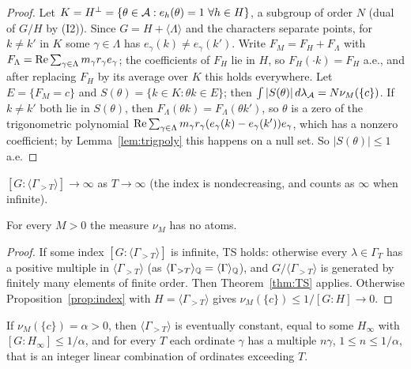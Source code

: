 \begin{proof}
Let $K=H^\perp=\{\theta\in\mathcal A:e_h(\theta)=1\ \forall h\in H\}$, a subgroup of order $N$ (dual of $G/H$ by (I2)). Since $G=H+\langle\Lambda\rangle$ and the characters separate points, for $k\ne k'$ in $K$ some $\gamma\in\Lambda$ has $e_\gamma(k)\ne e_\gamma(k')$. Write $F_M=F_H+F_\Lambda$ with $F_\Lambda=\operatorname{Re}\sum_{\gamma\in\Lambda}m_\gamma r_\gamma e_\gamma$; the coefficients of $F_H$ lie in $H$, so $F_H(\cdot k)=F_H$ a.e., and after replacing $F_H$ by its average over $K$ this holds everywhere. Let $E=\{F_M=c\}$ and $S(\theta)=\{k\in K:\theta k\in E\}$; then $\int|S(\theta)|\,d\lambda_{\mathcal A}=N\nu_M(\{c\})$. If $k\ne k'$ both lie in $S(\theta)$, then $F_\Lambda(\theta k)=F_\Lambda(\theta k')$, so $\theta$ is a zero of the trigonometric polynomial $\operatorname{Re}\sum_{\gamma\in\Lambda}m_\gamma r_\gamma(e_\gamma(k)-e_\gamma(k'))e_\gamma$, which has a nonzero coefficient; by Lemma~\ref{lem:trigpoly} this happens on a null set. So $|S(\theta)|\le1$ a.e.
\end{proof}

\begin{hypothesis}[TS$_\ZZ$]
$[G:\langle\Gamma_{>T}\rangle]\to\infty$ as $T\to\infty$ (the index is nondecreasing, and counts as $\infty$ when infinite).
\end{hypothesis}

\begin{theorem}\label{thm:TSZ}
For every $M>0$ the measure $\nu_M$ has no atoms.
\end{theorem}

\begin{proof}
If some index $[G:\langle\Gamma_{>T}\rangle]$ is infinite, TS holds: otherwise every $\lambda\in\Gamma_T$ has a positive multiple in $\langle\Gamma_{>T}\rangle$ (as $\langle\Gamma_{>T}\rangle_{\mathbb Q}=\langle\Gamma\rangle_{\mathbb Q}$), and $G/\langle\Gamma_{>T}\rangle$ is generated by finitely many elements of finite order. Then Theorem~\ref{thm:TS} applies. Otherwise Proposition~\ref{prop:index} with $H=\langle\Gamma_{>T}\rangle$ gives $\nu_M(\{c\})\le1/[G:H]\to0$.
\end{proof}

\begin{corollary}\label{cor:TSZatom}
If $\nu_M(\{c\})=\alpha>0$, then $\langle\Gamma_{>T}\rangle$ is eventually constant, equal to some $H_\infty$ with $[G:H_\infty]\le1/\alpha$, and for every $T$ each ordinate $\gamma$ has a multiple $n\gamma$, $1\le n\le1/\alpha$, that is an integer linear combination of ordinates exceeding $T$.
\end{corollary}

